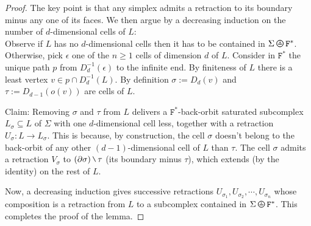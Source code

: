 \documentclass[10pt,a4paper]{amsart}
\newcommand{\Dual}{D}
\newcommand{\mysetminus}{\mathbin{\mathchoice{\mysetminusD}{\mysetminusT}{\mysetminusS}{\mysetminusSS}}}%
\newcommand{\mysetminusD}{\hbox{\tikz{\draw[line width=0.6pt,line cap=round] (3pt,0) -- (0,6pt);}}}
\newcommand{\mysetminusS}{\hbox{\tikz{\draw[line width=0.45pt,line cap=round] (2pt,0) -- (0,4pt);}}}
\newcommand{\mysetminusSS}{\hbox{\tikz{\draw[line width=0.4pt,line cap=round] (1.5pt,0) -- (0,3pt);}}}
\newcommand{\mysetminusT}{\mysetminusD}
\newcommand{\oPerpStar}{\begin{tikzpicture}[scale=0.134]
\draw[thick,line width=0.7pt](-0.6,-0.2)--(0.6,-0.2) ;
    \draw (0,0.1) node[scale=0.6] {\rm{*}};
  \draw[line width=0.7pt] (0,0) circle [radius=1];
\end{tikzpicture}}
\newcommand{\oPerpstar}{\mathbin{\raisebox{-1pt}{\oPerpStar}}}
\begin{document}
\begin{proof}
The key point is that any simplex admits a retraction to its boundary minus any one of its faces.
We then argue by a decreasing induction on the number of $d$-dimensional cells of $L$:
\\
Observe if $L$ has no $d$-dimensional cells then it has to be contained in ${\Sigma}\oPerpstar {{\mathtt{F}^{*}}}$.
\\
Otherwise, pick $\epsilon$ one of the $n\geq 1$ cells of dimension $d$ of $L$.
Consider in ${\mathtt{F}^{*}}$ the unique path $p$ from $\Dual_{d}^{-1}(\epsilon)$ to the infinite end.
By finiteness of $L$ there is a least vertex $v\in p\cap \Dual_{d}^{-1}(L)$.
By definition $\sigma:=\Dual_{d}(v)$ and $\tau:=\Dual_{d-1}(o(v))$ are cells of $L$.



Claim:
Removing $\sigma$ and $\tau$ from $L$ delivers a ${\mathtt{F}^{*}}$-back-orbit saturated subcomplex $L_{\sigma}\subseteq L$ of ${\Sigma} $ with one $d$-dimensional cell less, together with a retraction $U_{\sigma}: L\to L_{\sigma}$. 
This is because, by construction, the cell $\sigma$ doesn't belong to the back-orbit of any other $(d-1)$-dimensional cell of $L$ than $\tau$.
The cell $\sigma$ admits a retraction $V_{\sigma}$ to $(\partial \sigma)\mysetminus \tau$ (its boundary minus $\tau$), which extends (by the identity) on the rest of $L$.

Now, a decreasing induction gives successive retractions $U_{\sigma_1}, U_{\sigma_2}, \cdots, U_{\sigma_n}$ whose composition is a retraction from $L$ to a subcomplex contained in ${\Sigma}\oPerpstar {{\mathtt{F}^{*}}}$. This completes the proof of the lemma.\end{proof}
\end{document}
